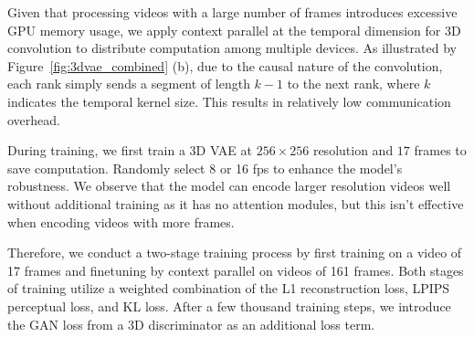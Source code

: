 Given that processing videos with a large number of frames introduces excessive GPU memory usage, we apply context parallel at the temporal dimension for 3D convolution to distribute computation among multiple devices. 
As illustrated by Figure~\ref{fig:3dvae_combined} (b), due to the causal nature of the convolution, each rank simply sends a segment of length $k-1$ to the next rank, where $k$ indicates the temporal kernel size. 
This results in relatively low communication overhead. 

During training, we first train a 3D VAE at $256\times256$ resolution and $17$ frames to save computation. Randomly select 8 or 16 fps to enhance the model's robustness.
We observe that the model can encode larger resolution videos well without additional training as it has no attention modules, but this isn't effective when encoding videos with more frames.

Therefore, we conduct a two-stage training process by first training on a video of 17 frames and finetuning by context parallel on videos of 161 frames. 
Both stages of training utilize a weighted combination of the L1 reconstruction loss, LPIPS~\citep{zhang2018unreasonable} perceptual loss, and KL loss. 
After a few thousand training steps, we introduce the GAN loss from a 3D discriminator as an additional loss term.
